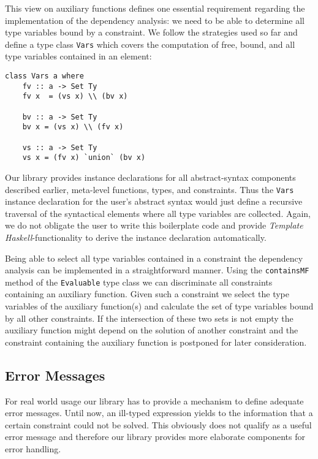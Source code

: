 This view on auxiliary functions defines one essential requirement
regarding the implementation of the dependency analysis: we need to be
able to determine all type variables bound by a constraint. We follow
the strategies used so far and define a type class \texttt{Vars} which
covers the computation of free, bound, and all type variables
contained in an element:
\begin{lstlisting}
class Vars a where
    fv :: a -> Set Ty
    fv x  = (vs x) \\ (bv x)

    bv :: a -> Set Ty
    bv x = (vs x) \\ (fv x)

    vs :: a -> Set Ty
    vs x = (fv x) `union` (bv x)
\end{lstlisting}
Our library provides instance declarations for all abstract-syntax
components described earlier, meta-level functions, types, and
constraints. Thus the \texttt{Vars} instance declaration for the
user's abstract syntax would just define a recursive traversal of the
syntactical elements where all type variables are collected. Again, we
do not obligate the user to write this boilerplate code and provide
\textit{Template Haskell}-functionality to derive the instance
declaration automatically.

Being able to select all type variables contained in a constraint the
dependency analysis can be implemented in a straightforward
manner. Using the \texttt{containsMF} method of the \texttt{Evaluable}
type class we can discriminate all constraints containing an
auxiliary function. Given such a constraint we select the type
variables of the auxiliary function(s) and calculate the set of type
variables bound by all other constraints. If the intersection of these
two sets is not empty the auxiliary function might depend on the
solution of another constraint and the constraint containing the
auxiliary function is postponed for later consideration.

\subsection{Error Messages}

For real world usage our library has to provide a mechanism to define
adequate error messages. Until now, an ill-typed expression yields to
the information that a certain constraint could not be solved. This
obviously does not qualify as a useful error message and therefore our
library provides more elaborate components for error handling.

